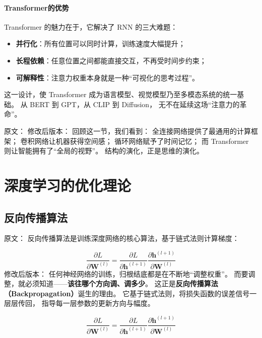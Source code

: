\paragraph{Transformer的优势}  
Transformer 的魅力在于，它解决了 RNN 的三大难题：

\begin{itemize}
\item \textbf{并行化}：所有位置可以同时计算，训练速度大幅提升；
\item \textbf{长程依赖}：任意位置之间都能直接交互，不再受时间步约束；
\item \textbf{可解释性}：注意力权重本身就是一种“可视化的思考过程”。
\end{itemize}

这一设计，使 Transformer 成为语言模型、视觉模型乃至多模态系统的统一基础。  
从 BERT 到 GPT，从 CLIP 到 Diffusion，  
无不在延续这场“注意力的革命”。



原文：
修改后版本：
回顾这一节，我们看到：  
全连接网络提供了最通用的计算框架；  
卷积网络让机器获得空间感；  
循环网络赋予了时间记忆；  
而 Transformer 则让智能拥有了“全局的视野”。  
结构的演化，正是思维的演化。

\section{深度学习的优化理论}

\subsection{反向传播算法}

原文：
反向传播算法是训练深度网络的核心算法，基于链式法则计算梯度：

$$\frac{\partial L}{\partial \mathbf{W}^{(l)}} = \frac{\partial L}{\partial \mathbf{h}^{(l+1)}} \frac{\partial \mathbf{h}^{(l+1)}}{\partial \mathbf{W}^{(l)}}$$
修改后版本：
任何神经网络的训练，归根结底都是在不断地“调整权重”。  
而要调整，就必须知道——\textbf{该往哪个方向调、调多少}。  
这正是\textbf{反向传播算法（Backpropagation）}诞生的理由。  
它基于链式法则，将损失函数的误差信号一层层传回，  
指导每一层参数的更新方向与幅度。

$$\frac{\partial L}{\partial \mathbf{W}^{(l)}} = \frac{\partial L}{\partial \mathbf{h}^{(l+1)}} \frac{\partial \mathbf{h}^{(l+1)}}{\partial \mathbf{W}^{(l)}}$$

